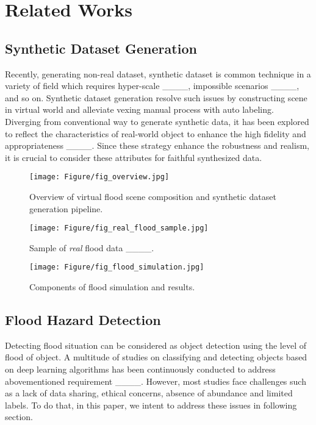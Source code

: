 \section{Related Works}
\subsection{Synthetic Dataset Generation}
\label{sec:rel_work_syntehtic}

Recently, generating non-real dataset, synthetic dataset is common technique in a variety of field which requires hyper-scale  ____, impossible scenarios     ____, and so on. Synthetic dataset generation resolve such issues by constructing scene in virtual world and alleviate vexing manual process with auto labeling. Diverging from conventional way to generate synthetic data, it has been explored to reflect the characteristics of real-world object to enhance the high fidelity and appropriateness   ____. Since these strategy enhance the robustness and realism, it is crucial to consider these attributes for faithful synthesized data.

\begin{figure*}[t]
    \centerline{\texttt{[image: Figure/fig\_overview.jpg]}}
    \caption{Overview of virtual flood scene composition and synthetic dataset generation pipeline.}
    \label{fig:overview}
\end{figure*}

\begin{figure}[t]
    \centerline{\texttt{[image: Figure/fig\_real\_flood\_sample.jpg]}}
    \caption{Sample of \textit{real} flood data   ____.}
    \label{fig:real_flood}
\end{figure}

\begin{figure}[t]
    \centerline{\texttt{[image: Figure/fig\_flood\_simulation.jpg]}}
    \caption{Components of flood simulation and results.}
    \label{fig:flood_simulation}
\end{figure}

\subsection{Flood Hazard Detection} \label{sec:rel_work_flood}

Detecting flood situation can be considered as object detection using the level of flood of object. A multitude of studies on classifying and detecting objects based on deep learning algorithms has been continuously conducted to address abovementioned requirement  ____. However, most studies face challenges such as a lack of data sharing, ethical concerns, absence of abundance and limited labels. To do that, in this paper, we intent to address these issues in following section.